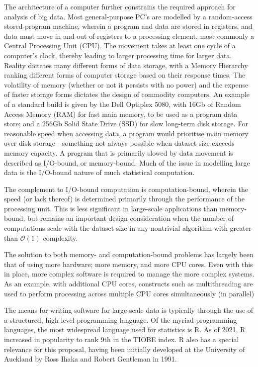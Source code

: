 \documentclass[a4paper,10pt]{article}
\begin{document}
The architecture of a computer further constrains the required approach for analysis of big data.
Most general-purpose PC's are modelled by a random-access stored-program machine, wherein a program and data are stored in registers, and data must move in and out of registers to a processing element, most commonly a Central Processing Unit (CPU). 
The movement takes at least one cycle of a computer's clock, thereby leading to larger processing time for larger data.
Reality dictates many different forms of data storage, with a Memory Hierarchy ranking different forms of computer storage based on their response times\cite{toy1986computer}.
The volatility of memory (whether or not it persists with no power) and the expense of faster storage forms dictates the design of commodity computers. An example of a standard build is given by the Dell Optiplex 5080, with 16Gb of Random Access Memory (RAM) for fast main memory, to be used as a program data store; and a 256Gb Solid State Drive (SSD) for slow long-term disk storage\cite{cornell2021standardcomp}.
For reasonable speed when accessing data, a program would prioritise main memory over disk storage - something not always possible when dataset size exceeds memory capacity.
A program that is primarily slowed by data movement is described as I/O-bound, or memory-bound.
Much of the issue in modelling large data is the I/O-bound nature of much statistical computation.

The complement to I/O-bound computation is computation-bound, wherein the speed (or lack thereof) is determined primarily through the performance of the processing unit. This is less significant in large-scale applications than memory-bound, but remains an important design consideration when the number of computations scale with the dataset size in any nontrivial algorithm with greater than \(\mathcal{O}(1)\) complexity.

The solution to both memory- and computation-bound problems has largely been that of using more hardware; more memory, and more CPU cores. Even with this in place, more complex software is required to manage the more complex systems. As an example, with additional CPU cores, constructs such as multithreading are used to perform processing across multiple CPU cores simultaneously (in parallel)

The means for writing software for large-scale data is typically through the use of a structured, high-level programming language.
Of the myriad programming languages, the most widespread language used for statistics is R.
As of 2021, R increased in popularity to rank 9th in the TIOBE index.
R also has a special relevance for this proposal, having been initially developed at the University of Auckland by Ross Ihaka and Robert Gentleman in 1991\cite{ihaka1996r}.
\end{document}

